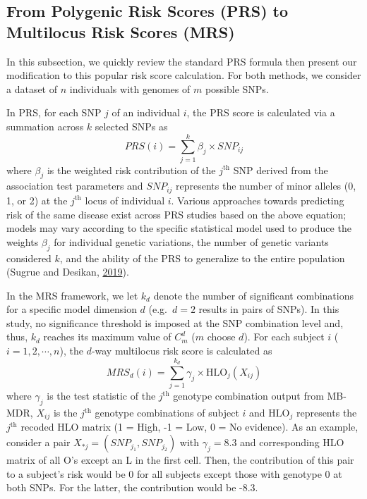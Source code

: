 \documentclass[a4paper,twoside, 9pt]{article}
\begin{document}
\subsection{From Polygenic Risk Scores (PRS) to Multilocus Risk
Scores
(MRS)}\label{from-polygenic-risk-scores-prs-to-multilocus-risk-scores-mrs}

\noindent In this subsection, we quickly review the standard PRS formula then
present our modification to this popular risk score calculation. For
both methods, we consider a dataset of \(n\) individuals with genomes of
\(m\) possible SNPs.

In PRS, for each SNP \(j\) of an individual \(i\), the PRS score is
calculated via a summation across \(k\) selected SNPs as
\begin{equation}\label{eq1}
PRS(i)=\sum_{j=1}^{k} \beta_j \times SNP_{ij}
\end{equation}
where \(\beta_j\) is
the weighted risk contribution of the \(j^\textrm{th}\) SNP derived from
the association test parameters and \(SNP_{ij}\) represents the number
of minor alleles (0, 1, or 2) at the \(j^\textrm{th}\) locus of
individual \(i\). Various approaches towards predicting risk of the same
disease exist across PRS studies based on the above equation; models may
vary according to the specific statistical model used to produce the
weights \(\beta_j\) for individual genetic variations, the number of
genetic variants considered \(k\), and the ability of the PRS to
generalize to the entire population (Sugrue and Desikan,
\protect\hyperlink{ref-1Dlv3tAGh}{2019}).

In the MRS framework, we let \(k_d\) denote the number of significant
combinations for a specific model dimension \(d\) (e.g.~\(d = 2\)
results in pairs of SNPs). In this study, no significance threshold is
imposed at the SNP combination level and, thus, \(k_d\) reaches its
maximum value of \(C^d_m\) (\(m\) choose \(d\)). For each subject \(i\)
(\(i = 1,2, \dotsm, n\)), the \(d\)-way multilocus risk score is
calculated as
\begin{equation}\label{eq2}
MRS_d(i) = \sum_{j = 1}^{k_d} \gamma_j \times \textrm{HLO}_j(X_{ij})
\end{equation}
where \(\gamma_j\) is the test statistic of the \(j^\textrm{th}\)
genotype combination output from MB-MDR, \(X_{ij}\) is the
\(j^\textrm{th}\) genotype combinations of subject \(i\) and
\(\textrm{HLO}_j\) represents the \(j^\textrm{th}\) recoded HLO matrix
(1 = High, -1 = Low, 0 = No evidence). As an example, consider a pair
\(X_{*j} = (SNP_{j_1}, SNP_{j_2})\) with \(\gamma_j=8.3\) and
corresponding HLO matrix of all O's except an L in the first cell.
Then, the contribution of this pair to a subject's risk would be 0 for all subjects except those with genotype 0 at both SNPs.
For the latter, the contribution would be -8.3.
\end{document}
